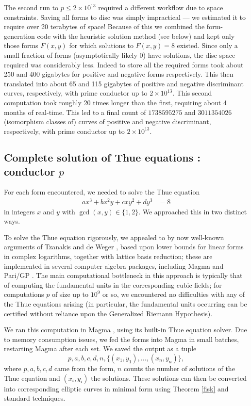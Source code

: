 The second run to $p \leq 2\times 10^{13}$ required a different workflow due to space constraints. Saving all 
forms to disc was simply impractical --- we estimated it to require over 20 terabytes of space! Because of this we 
combined the form-generation code with the heuristic solution method (see below) and kept only those forms $F(x,y)$ 
for which solutions to $F(x,y)=8$ existed. Since only a small fraction of forms (asymptotically likely $0$)  have 
solutions, the disc space required was considerably less. Indeed to store all the required forms took about 250 and 400 
gigabytes for positive and negative forms respectively. This then translated into about 65 and 115 gigabytes of 
positive and negative discriminant curves, respectively, with prime conductor up to $2\times 10^{13}$. This 
second computation took roughly 20 times longer than the first, requiring about 4 months of real-time. This led to 
a final count of $1738595275$ and $3011354026$ (isomorphism classes of) curves of positive and negative discriminant, respectively, with prime 
conductor up to $2\times 10^{13}$.


\subsection{Complete solution of Thue equations : conductor $p$}
For each form encountered, we needed to solve the Thue equation
\begin{align*}
  ax^3+bx^2y+cxy^2+dy^3 &= 8
\end{align*}
in integers $x$ and $y$ with $\gcd(x,y) \in\{ 1, 2 \}$.
We approached this in two distinct ways.

To solve the Thue equation rigorously, we appealed to by now well-known arguments of Tzanakis and de Weger \cite{TW}, based upon lower bounds for linear forms in complex logarithms, together with lattice basis reduction; these are implemented in several computer algebra packages, including  Magma \cite{magma} and Pari/GP \cite{PARI2}. The main computational bottleneck in this approach is typically that of computing the fundamental units in the corresponding cubic fields; for computations $p$ of size up to $10^9$ or so, we encountered no difficulties with any of the Thue equations arising (in particular, the fundamental units occurring can be certified without reliance upon the Generalized Riemann Hypothesis).

We ran this computation in Magma \cite{magma}, using  its 
built-in Thue equation solver. Due to memory consumption issues, we fed the forms into 
Magma in small batches, restarting Magma after each set. We saved the 
output as a tuple 
$$
p,a,b,c,d,n,\{(x_1,y_1),\dots,(x_n,y_n)\}, 
$$
where $p,a,b,c,d$ came 
from the form, $n$ counts the number of solutions of the Thue equation and $(x_i,y_i)$ the 
solutions. These solutions can then be converted into corresponding elliptic curves in minimal form using Theorem \ref{fisk} and standard techniques. 

